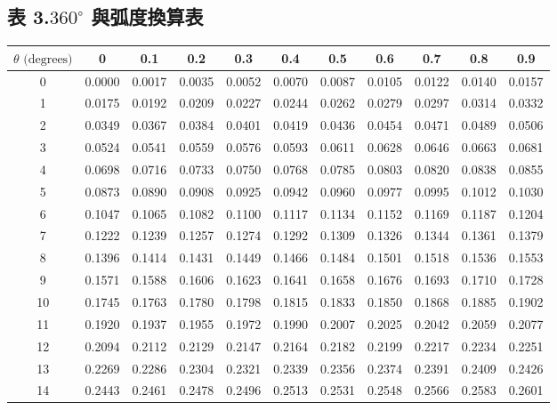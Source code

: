 \subsection*{表 3.\quad $360^\circ$ 與弧度換算表}
{\centering\fontsize{7.5pt}{8.8pt}\selectfont\setlength{\tabcolsep}{3.5pt}\renewcommand{\arraystretch}{0.96}
\begin{tabular}{|c|cccccccccc|}
\hline
$\theta\text{ (degrees)}$ & 0 & 0.1 & 0.2 & 0.3 & 0.4 & 0.5 & 0.6 & 0.7 & 0.8 & 0.9 \\ \hline
0 & 0.0000 & 0.0017 & 0.0035 & 0.0052 & 0.0070 & 0.0087 & 0.0105 & 0.0122 & 0.0140 & 0.0157 \\
1 & 0.0175 & 0.0192 & 0.0209 & 0.0227 & 0.0244 & 0.0262 & 0.0279 & 0.0297 & 0.0314 & 0.0332 \\
2 & 0.0349 & 0.0367 & 0.0384 & 0.0401 & 0.0419 & 0.0436 & 0.0454 & 0.0471 & 0.0489 & 0.0506 \\
3 & 0.0524 & 0.0541 & 0.0559 & 0.0576 & 0.0593 & 0.0611 & 0.0628 & 0.0646 & 0.0663 & 0.0681 \\
4 & 0.0698 & 0.0716 & 0.0733 & 0.0750 & 0.0768 & 0.0785 & 0.0803 & 0.0820 & 0.0838 & 0.0855 \\
\hline
5 & 0.0873 & 0.0890 & 0.0908 & 0.0925 & 0.0942 & 0.0960 & 0.0977 & 0.0995 & 0.1012 & 0.1030 \\
6 & 0.1047 & 0.1065 & 0.1082 & 0.1100 & 0.1117 & 0.1134 & 0.1152 & 0.1169 & 0.1187 & 0.1204 \\
7 & 0.1222 & 0.1239 & 0.1257 & 0.1274 & 0.1292 & 0.1309 & 0.1326 & 0.1344 & 0.1361 & 0.1379 \\
8 & 0.1396 & 0.1414 & 0.1431 & 0.1449 & 0.1466 & 0.1484 & 0.1501 & 0.1518 & 0.1536 & 0.1553 \\
9 & 0.1571 & 0.1588 & 0.1606 & 0.1623 & 0.1641 & 0.1658 & 0.1676 & 0.1693 & 0.1710 & 0.1728 \\
\hline
10 & 0.1745 & 0.1763 & 0.1780 & 0.1798 & 0.1815 & 0.1833 & 0.1850 & 0.1868 & 0.1885 & 0.1902 \\
11 & 0.1920 & 0.1937 & 0.1955 & 0.1972 & 0.1990 & 0.2007 & 0.2025 & 0.2042 & 0.2059 & 0.2077 \\
12 & 0.2094 & 0.2112 & 0.2129 & 0.2147 & 0.2164 & 0.2182 & 0.2199 & 0.2217 & 0.2234 & 0.2251 \\
13 & 0.2269 & 0.2286 & 0.2304 & 0.2321 & 0.2339 & 0.2356 & 0.2374 & 0.2391 & 0.2409 & 0.2426 \\
14 & 0.2443 & 0.2461 & 0.2478 & 0.2496 & 0.2513 & 0.2531 & 0.2548 & 0.2566 & 0.2583 & 0.2601 \\

\end{tabular}}
